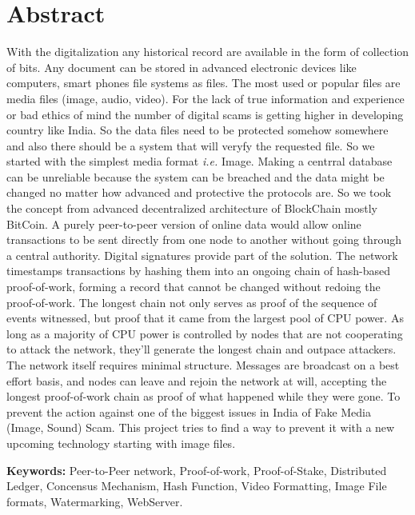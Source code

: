 \newpage
\chapter*{Abstract}
With the digitalization any historical record are available in the form of collection of bits. Any document can be stored in advanced electronic devices like computers, smart phones file systems as files. The most used or popular files are media files (image, audio, video). For the lack of true information and experience or bad ethics of mind the number of digital scams is getting higher in developing country like India. So the data files need to be protected somehow somewhere and also there should be a system that will veryfy the requested file. So we started with the simplest media format \textit{i.e.} Image. Making a centrral database can be unreliable because the system can be breached and the data might be changed no matter how advanced and protective the protocols are. So we took the concept from advanced decentralized architecture of BlockChain mostly BitCoin.
A purely peer-to-peer version of online data would allow online transactions to be sent directly from one node to another without going through a central authority. Digital signatures provide part of the solution.
The network timestamps transactions by hashing them into an ongoing chain of hash-based proof-of-work, forming a record that cannot be changed without redoing the proof-of-work. The longest chain not only serves as proof of the sequence of events witnessed, but proof that it came from the largest pool of CPU power. As long as a majority of CPU power is controlled by nodes that are not cooperating to attack the network, they'll generate the longest chain and outpace attackers. The network itself requires minimal structure. Messages are broadcast on a best effort basis, and nodes can leave and rejoin the network at will, accepting the longest proof-of-work chain as proof of what happened while they were gone.
To prevent the action against one of the biggest issues in India of Fake Media (Image, Sound) Scam. This project tries to find a way to prevent it with a new upcoming technology starting with image files.

\textbf{Keywords:} Peer-to-Peer network, Proof-of-work, Proof-of-Stake, Distributed Ledger, Concensus Mechanism, Hash Function, Video Formatting, Image File formats, Watermarking, WebServer.
